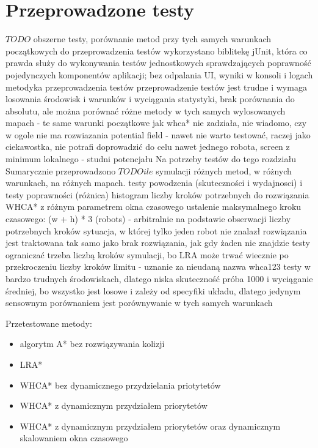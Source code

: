 \chapter{Przeprowadzone testy}
\label{ch:tests}

$TODO$
obszerne testy, porównanie metod przy tych samych warunkach początkowych
do przeprowadzenia testów wykorzystano biblitekę jUnit, która co prawda służy do wykonywania testów jednostkowych sprawdzających poprawność pojedynczych komponentów aplikacji; bez odpalania UI, wyniki w konsoli i logach
metodyka przeprowadzenia testów
przeprowadzenie testów jest trudne i wymaga losowania środowisk i warunków i wyciągania statystyki, brak porównania do absolutu, ale można porównać różne metody w tych samych wylosowanych mapach - te same warunki początkowe
jak whca* nie zadziała, nie wiadomo, czy w ogole nie ma rozwiazania
potential field - nawet nie warto testować, raczej jako ciekawostka, nie potrafi doprowadzić do celu nawet jednego robota, screen z minimum lokalnego - studni potencjału
Na potrzeby testów do tego rozdziału Sumarycznie przeprowadzono $TODO ile$ symulacji różnych metod, w różnych warunkach, na różnych mapach.
testy powodzenia (skuteczności i wydajnosci) i testy poprawności (różnica)
histogram liczby kroków potrzebnych do rozwiązania
WHCA* z różnym parametrem okna czasowego
ustalenie maksymalnego kroku czasowego: (w + h) * 3 (robots) - arbitralnie na podstawie obserwacji liczby potrzebnych kroków
sytuacja, w której tylko jeden robot nie znalazł rozwiązania jest traktowana tak samo jako brak rozwiązania, jak gdy żaden nie znajdzie
testy ograniczać trzeba liczbą kroków symulacji, bo LRA może trwać wiecznie
po przekroczeniu liczby kroków limitu - uznanie za nieudaną
nazwa whca123
testy w bardzo trudnych środowiskach, dlatego niska skuteczność
próba 1000 i wyciąganie średniej, bo wszystko jest losowe i zależy od specyfiki układu, dlatego jedynym sensownym porównaniem jest porównywanie w tych samych warunkach

Przetestowane metody:
\begin{itemize}
	\item algorytm A* bez rozwiązywania kolizji
	\item LRA*
	\item WHCA* bez dynamicznego przydzielania priotytetów
	\item WHCA* z dynamicznym przydziałem priorytetów
	\item WHCA* z dynamicznym przydziałem priorytetów oraz dynamicznym skalowaniem okna czasowego
\end{itemize}

